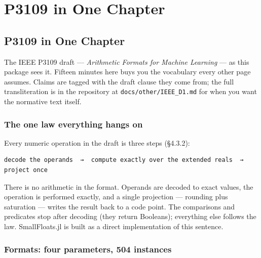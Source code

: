 \chapter{P3109 in One Chapter}


\section{P3109 in One Chapter}



\label{8455930311491811716}{}


The IEEE P3109 draft — \emph{Arithmetic Formats for Machine Learning} — as this package sees it. Fifteen minutes here buys you the vocabulary every other page assumes. Claims are tagged with the draft clause they come from; the full transliteration is in the repository at \texttt{docs/other/IEEE\_\allowbreak{}D1.md} for when you want the normative text itself.



\subsection{The one law everything hangs on}



\label{17993345610855520848}{}


Every numeric operation in the draft is three steps (§4.3.2):




\nopagebreak[4]
\begin{verbatim}
decode the operands  →  compute exactly over the extended reals  →  project once
\end{verbatim}



There is no arithmetic {\textquotedbl}in the format.{\textquotedbl} Operands are decoded to exact values, the operation is performed exactly, and a single projection — rounding plus saturation — writes the result back to a code point. The comparisons and predicates stop after decoding (they return Booleans); everything else follows the law. SmallFloats.jl is built as a direct implementation of this sentence.



\subsection{Formats: four parameters, 504 instances}



